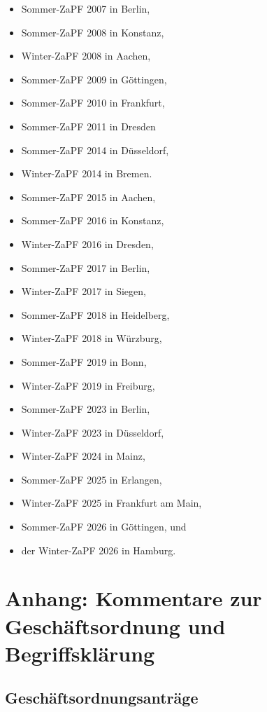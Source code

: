 \documentclass[
  ngerman,
  a4paper,
  oneside]{scrartcl}
\providecommand{\tightlist}{%
  \setlength{\itemsep}{0pt}\setlength{\parskip}{0pt}}
\begin{document}
\begin{itemize}
\tightlist
\item
  Sommer-ZaPF 2007 in Berlin,
\item
  Sommer-ZaPF 2008 in Konstanz,
\item
  Winter-ZaPF 2008 in Aachen,
\item
  Sommer-ZaPF 2009 in Göttingen,
\item
  Sommer-ZaPF 2010 in Frankfurt,
\item
  Sommer-ZaPF 2011 in Dresden
\item
  Sommer-ZaPF 2014 in Düsseldorf,
\item
  Winter-ZaPF 2014 in Bremen.
\item
  Sommer-ZaPF 2015 in Aachen,
\item
  Sommer-ZaPF 2016 in Konstanz,
\item
  Winter-ZaPF 2016 in Dresden,
\item
  Sommer-ZaPF 2017 in Berlin,
\item
  Winter-ZaPF 2017 in Siegen,
\item
  Sommer-ZaPF 2018 in Heidelberg,
\item
  Winter-ZaPF 2018 in Würzburg,
\item
  Sommer-ZaPF 2019 in Bonn,
\item
  Winter-ZaPF 2019 in Freiburg,
\item
  Sommer-ZaPF 2023 in Berlin,
\item
  Winter-ZaPF 2023 in Düsseldorf,
\item
  Winter-ZaPF 2024 in Mainz,
\item
  Sommer-ZaPF 2025 in Erlangen,
\item
  Winter-ZaPF 2025 in Frankfurt am Main,
\item
  Sommer-ZaPF 2026 in Göttingen, und
\item
  der Winter-ZaPF 2026 in Hamburg.
\end{itemize}

\section*{Anhang: Kommentare zur Geschäftsordnung und
Begriffsklärung}\label{anhang-kommentare-zur-geschuxe4ftsordnung-und-begriffskluxe4rung}

\subsection*{Geschäftsordnungsanträge}\label{geschuxe4ftsordnungsantruxe4ge-1}
\end{document}
